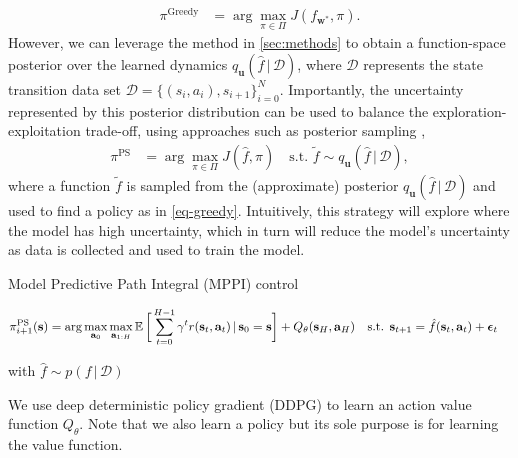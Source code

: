 \documentclass{article}
\newcommand{\state}{\ensuremath{\mathbf{s}}}
\newcommand{\action}{\ensuremath{\mathbf{a}}}
\newcommand{\noise}{\ensuremath{\bm\epsilon}}
\newcommand{\dataset}{\ensuremath{\mathcal{D}}}
\newcommand{\Horizon}{\ensuremath{H}}
\newcommand{\transitionFn}{\ensuremath{f}}
\newcommand{\policy}{\ensuremath{\pi}}
\renewcommand{\mid}{\,|\,}
\begin{document}
\begin{align} \label{eq-greedy}
  \policy^{\text{Greedy}} &= \arg \max_{\pi \in \Pi} J(f_{\mathbf{w}^{*}}, \pi).
\end{align}
However, we can leverage the method in \cref{sec:methods} to obtain a function-space posterior over the learned dynamics $q_{\mathbf{u}}(\hat{\transitionFn} \mid \dataset)$,
where $\mathcal{D}$ represents the state transition data set \(\mathcal{D} = \{(s_{i},a_{i}), s_{i+1}\}_{i=0}^{N}\).
Importantly, the uncertainty represented by this posterior distribution can be used to balance the exploration-exploitation trade-off,
using approaches such as posterior sampling \cite{osbandWhyPosteriorSampling2017,osbandMoreEfficientReinforcement2013},
\begin{align} \label{eq-posterior-sampling}
  \policy^{\text{PS}} &= \arg \max_{\pi \in \Pi} J(\hat{f}, \pi)
\quad \text{s.t. } \tilde{\transitionFn} \sim q_{\mathbf{u}}(\hat{\transitionFn} \mid \dataset),
\end{align}
where a function $\tilde{\transitionFn}$ is sampled from the (approximate) posterior $q_{\mathbf{u}}(\hat{\transitionFn} \mid \dataset)$ and used to find a policy as
in \cref{eq-greedy}.
Intuitively, this strategy will explore where the model has high uncertainty, which in turn will reduce the model's uncertainty as data is collected and used to
train the model.



Model Predictive Path Integral (MPPI) control
\cite{panSample2015}
\cite{williamsModel2017}

\begin{align} \label{eq-fast-update-mpc}
  \policy_{i+1}^{\text{PS}}(\state) = \arg \max_{\action_{0}} \max_{\action_{1:\Horizon}}
\E \bigg[ \sum_{t=0}^{H-1} \gamma^{t} r(\state_{t},\action_{t}) \mid \state_{0}=\state  \bigg] + Q_{\theta}(\state_{\Horizon}, \action_{H})
\quad \text{s.t. } \state_{t+1} &= \hat{\transitionFn}(\state_{t}, \action_{t}) + \noise_{t}
\end{align}

with $\hat{\transitionFn} \sim p(\transitionFn \mid \dataset)$

We use deep deterministic policy gradient (DDPG) \cite{lillicrapContinuousControlDeep2016} to learn an action value function $Q_{\theta}$.
Note that we also learn a policy but its sole purpose is for learning the value function.
\end{document}
